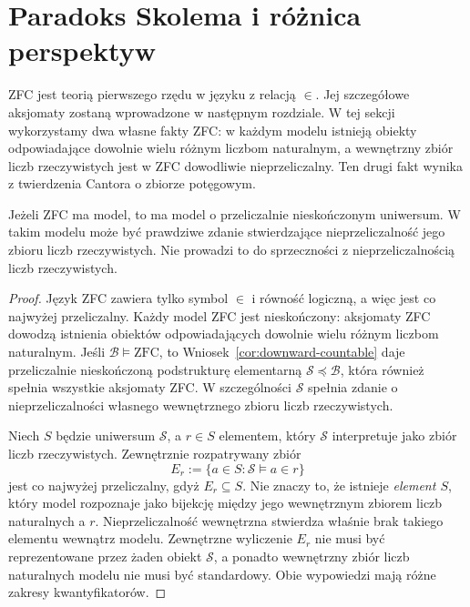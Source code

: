 \section{Paradoks Skolema i różnica perspektyw}
\begin{uwaga}
\label{rem:ls-zfc-intro}
ZFC jest teorią pierwszego rzędu
w języku z relacją $\in$.
Jej szczegółowe aksjomaty zostaną
wprowadzone w następnym rozdziale.
W tej sekcji wykorzystamy dwa
własne fakty ZFC: w każdym modelu
istnieją obiekty odpowiadające
dowolnie wielu różnym liczbom
naturalnym, a wewnętrzny zbiór
liczb rzeczywistych jest w ZFC
dowodliwie nieprzeliczalny.
Ten drugi fakt wynika z twierdzenia
Cantora o zbiorze potęgowym.
\end{uwaga}

\begin{twierdzenie}
\label{thm:skolem-paradox}
Jeżeli ZFC ma model, to ma model
o przeliczalnie nieskończonym uniwersum.
W takim modelu może być prawdziwe
zdanie stwierdzające nieprzeliczalność
jego zbioru liczb rzeczywistych.
Nie prowadzi to do sprzeczności
z nieprzeliczalnością liczb rzeczywistych.
\end{twierdzenie}
\begin{proof}
Język ZFC zawiera tylko symbol $\in$
i równość logiczną, a więc jest
co najwyżej przeliczalny.
Każdy model ZFC jest nieskończony:
aksjomaty ZFC dowodzą istnienia
obiektów odpowiadających dowolnie
wielu różnym liczbom naturalnym.
Jeśli $\mathcal B\models\mathrm{ZFC}$,
to Wniosek~\ref{cor:downward-countable}
daje przeliczalnie nieskończoną
podstrukturę elementarną
$\mathcal S\preccurlyeq\mathcal B$,
która również spełnia wszystkie
aksjomaty ZFC. W szczególności
$\mathcal S$ spełnia zdanie
o nieprzeliczalności własnego
wewnętrznego zbioru liczb rzeczywistych.

Niech $S$ będzie uniwersum
$\mathcal S$, a $r\in S$ elementem,
który $\mathcal S$ interpretuje jako
zbiór liczb rzeczywistych.
Zewnętrznie rozpatrywany zbiór
\[
E_r:=\{a\in S:\mathcal S\models a\in r\}
\]
jest co najwyżej przeliczalny,
gdyż $E_r\subseteq S$.
Nie znaczy to, że istnieje
\emph{element $S$}, który model
rozpoznaje jako bijekcję między
jego wewnętrznym zbiorem liczb
naturalnych a $r$.
Nieprzeliczalność wewnętrzna
stwierdza właśnie brak takiego
elementu wewnątrz modelu.
Zewnętrzne wyliczenie $E_r$
nie musi być reprezentowane
przez żaden obiekt $\mathcal S$,
a ponadto wewnętrzny zbiór liczb
naturalnych modelu nie musi być
standardowy. Obie wypowiedzi
mają różne zakresy kwantyfikatorów.
\end{proof}

